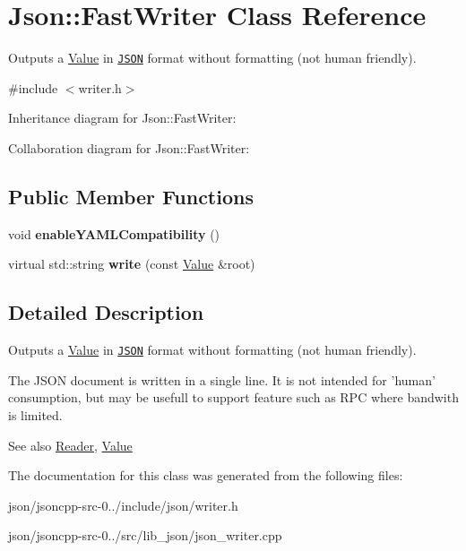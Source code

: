 \hypertarget{class_json_1_1_fast_writer}{\section{Json\+:\+:Fast\+Writer Class Reference}
\label{class_json_1_1_fast_writer}
}


Outputs a \hyperlink{class_json_1_1_value}{Value} in \href{http://www.json.org}{\tt J\+S\+O\+N} format without formatting (not human friendly).  




{\ttfamily \#include $<$writer.\+h$>$}



Inheritance diagram for Json\+:\+:Fast\+Writer\+:


Collaboration diagram for Json\+:\+:Fast\+Writer\+:
\subsection*{Public Member Functions}
\begin{DoxyCompactItemize}
\item 
\hypertarget{class_json_1_1_fast_writer_a78d98e9f76d33660ad6e6a1abe287d45}{void {\bfseries enable\+Y\+A\+M\+L\+Compatibility} ()}\label{class_json_1_1_fast_writer_a78d98e9f76d33660ad6e6a1abe287d45}

\item 
\hypertarget{class_json_1_1_fast_writer_aa66218a56447222f91d64db618935a19}{virtual std\+::string {\bfseries write} (const \hyperlink{class_json_1_1_value}{Value} \&root)}\label{class_json_1_1_fast_writer_aa66218a56447222f91d64db618935a19}

\end{DoxyCompactItemize}


\subsection{Detailed Description}
Outputs a \hyperlink{class_json_1_1_value}{Value} in \href{http://www.json.org}{\tt J\+S\+O\+N} format without formatting (not human friendly). 

The J\+S\+O\+N document is written in a single line. It is not intended for 'human' consumption, but may be usefull to support feature such as R\+P\+C where bandwith is limited. \begin{DoxySeeAlso}{See also}
\hyperlink{class_json_1_1_reader}{Reader}, \hyperlink{class_json_1_1_value}{Value} 
\end{DoxySeeAlso}


The documentation for this class was generated from the following files\+:\begin{DoxyCompactItemize}
\item 
json/jsoncpp-\/src-\/0../include/json/writer.\+h\item 
json/jsoncpp-\/src-\/0../src/lib\+\_\+json/json\+\_\+writer.\+cpp\end{DoxyCompactItemize}

